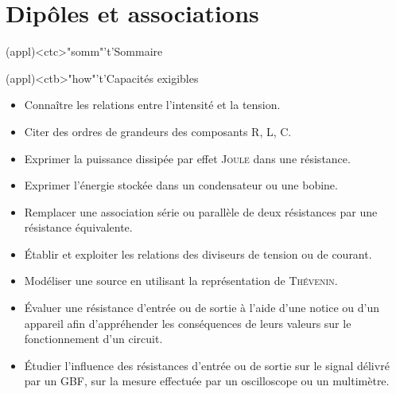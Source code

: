 \documentclass[../../main/main.tex]{subfiles}
\begin{document}
\setcounter{chapter}{1}


\chapter{Dipôles et associations}

\vspace*{\fill}

\begin{tcn}(appl)<ctc>"somm"'t'{Sommaire}
	\let\item\olditem
	\vspace{-15pt}
	\minitoc
	\vspace{-25pt}
\end{tcn}

\begin{tcn}[sidebyside](appl)<ctb>"how"'t'{Capacités exigibles}
	\begin{itemize}[label=\rcheck]
		\item Connaître les relations entre l'intensité et la tension.
		\item Citer des ordres de grandeurs des composants R, L, C.
		\item Exprimer la puissance dissipée par effet \textsc{Joule} dans une
		      résistance.
		\item Exprimer l'énergie stockée dans un condensateur ou une bobine.
		\item Remplacer une association série ou parallèle de deux
		      résistances par une résistance équivalente.
		\item Établir et exploiter les relations des diviseurs de
		      tension ou de courant.
	\end{itemize}
	\tcblower
	\begin{itemize}[label=\rcheck]
		\item Modéliser une source en utilisant la représentation de
		      \textsc{Thévenin}.
		\item Évaluer une résistance d'entrée ou de sortie à
		      l'aide d'une notice ou d'un appareil afin d'appréhender les
		      conséquences de leurs valeurs sur le fonctionnement d'un circuit.
		\item Étudier l'influence des résistances d'entrée ou de
		      sortie sur le signal délivré par un GBF, sur la mesure effectuée par
		      un oscilloscope ou un multimètre.
	\end{itemize}
\end{tcn}
\end{document}
